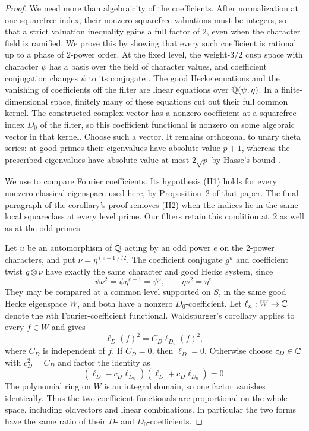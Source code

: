 \begin{proof}
We need more than algebraicity of the coefficients. After normalization
at one squarefree index, their nonzero squarefree valuations must be
integers, so that a strict valuation inequality gains a full factor of
$2$, even when the character field is ramified. We prove this by showing
that every such coefficient is rational up to a phase of $2$-power order.
At the fixed level,
the weight-$3/2$ cusp space with character $\psi$ has a basis over the
field of character values, and coefficient conjugation changes $\psi$
to its conjugate
\citep[Section~2, Lemma~4(3)--(4), pp.~658--659]{Shimura1981CriticalValues}.
The good Hecke equations and the vanishing of coefficients off the
filter are linear equations over $\mathbb Q(\psi,\eta)$.  In a finite-dimensional
space, finitely many of these equations cut out their full common
kernel.  The constructed complex vector has a nonzero coefficient at
a squarefree index $D_0$ of the filter, so this coefficient functional
is nonzero on some algebraic vector in that kernel.  Choose such a
vector.  It remains orthogonal to unary theta series: at good primes
their eigenvalues have absolute value $p+1$, whereas the prescribed
eigenvalues have absolute value at most $2\sqrt p$ by Hasse's bound
\citep[Section~2, Lemma~2.1, and Corollary~5.2]{Purkait2012}.

We use \citet[Corollary~2, pp.~483--484]{Waldspurger1981} to compare
Fourier coefficients.  Its hypothesis (H1) holds for every nonzero
classical eigenspace used here, by Proposition~2 of that paper.
The final paragraph of the corollary's proof removes (H2) when the
indices lie in the same local squareclass at every level prime.
Our filters retain this condition at~$2$ as well as at the odd primes.

Let $u$ be an automorphism of $\overline{\mathbb Q}$ acting by an odd power $e$
on the $2$-power characters, and put $\nu=\eta^{(e-1)/2}$.  The
coefficient conjugate $g^u$ and coefficient twist $g\otimes\nu$ have
exactly the same character and good Hecke system, since
\[
 \psi\nu^2=\psi\eta^{e-1}=\psi^e,
                 \qquad \eta\nu^2=\eta^e.
\]
They may be compared at a common level supported on $S$, in the same
good Hecke eigenspace $W$, and both have a nonzero $D_0$-coefficient.
Let $\ell_n:W\to\mathbb C$ denote the $n$th Fourier-coefficient functional.
Waldspurger's corollary applies to every $f\in W$ and gives
\[
                    \ell_D(f)^2=C_D\ell_{D_0}(f)^2,
\]
where $C_D$ is independent of $f$.  If $C_D=0$, then $\ell_D=0$.
Otherwise choose $c_D\in\mathbb C$ with $c_D^2=C_D$ and factor the identity
as
\[
       (\ell_D-c_D\ell_{D_0})(\ell_D+c_D\ell_{D_0})=0.
\]
The polynomial ring on $W$ is an integral domain, so one factor
vanishes identically.  Thus the two coefficient functionals are
proportional on the whole space, including oldvectors and linear
combinations.  In particular the two forms have the same ratio of
their $D$- and $D_0$-coefficients.


\end{proof}
